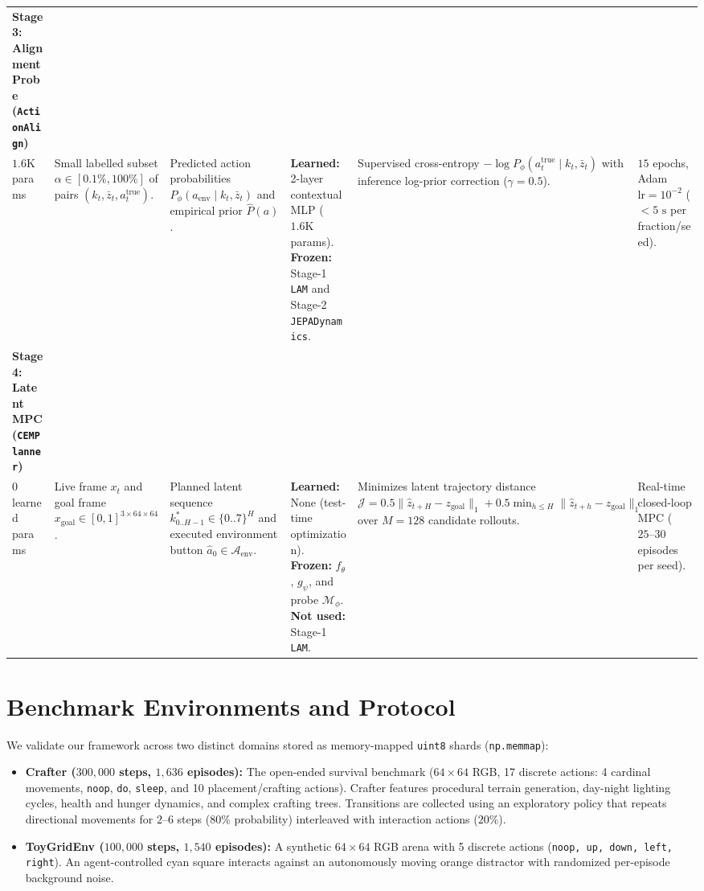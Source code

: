 \documentclass[11pt,letterpaper]{article}
\begin{document}
\begin{table}[t]
{\begin{tabular}{p{2.8cm}p{3.5cm}p{3.2cm}p{3.5cm}p{3.9cm}p{2.6cm}}
\midrule
\textbf{Stage 3: Alignment Probe (\texttt{ActionAlign})}\\ \footnotesize $1.6\text{K}$ params & Small labelled subset $\alpha \in [0.1\%, 100\%]$ of pairs $(k_t, \bar{z}_t, a_t^{\text{true}})$. & Predicted action probabilities $P_\phi(a_{\text{env}} \mid k_t, \bar{z}_t)$ and empirical prior $\hat{P}(a)$. & \textbf{Learned:} 2-layer contextual MLP ($1.6\text{K}$ params). \textbf{Frozen:} Stage-1 \texttt{LAM} and Stage-2 \texttt{JEPADynamics}. & Supervised cross-entropy $-\log P_\phi(a_t^{\text{true}} \mid k_t, \bar{z}_t)$ with inference log-prior correction ($\gamma = 0.5$). & $15$ epochs, Adam $\text{lr}=10^{-2}$ ($<5\text{ s}$ per fraction/seed). \\
\midrule
\textbf{Stage 4: Latent MPC (\texttt{CEMPlanner})}\\ \footnotesize $0$ learned params & Live frame $x_t$ and goal frame $x_{\text{goal}} \in [0,1]^{3 \times 64 \times 64}$. & Planned latent sequence $k_{0..H-1}^* \in \{0..7\}^H$ and executed environment button $\hat{a}_0 \in \mathcal{A}_{\text{env}}$. & \textbf{Learned:} None (test-time optimization). \textbf{Frozen:} $f_\theta$, $g_\psi$, and probe $\mathcal{M}_\phi$. \textbf{Not used:} Stage-1 \texttt{LAM}. & Minimizes latent trajectory distance $\mathcal{J} = 0.5\|\hat{z}_{t+H} - z_{\text{goal}}\|_1 + 0.5\min_{h \le H}\|\hat{z}_{t+h} - z_{\text{goal}}\|_1$ over $M=128$ candidate rollouts. & Real-time closed-loop MPC ($25\text{--}30$ episodes per seed). \\
\bottomrule
\end{tabular}%
}
\end{table}

\section{Benchmark Environments and Protocol}
We validate our framework across two distinct domains stored as memory-mapped \texttt{uint8} shards (\texttt{np.memmap}):
\begin{itemize}
  \item \textbf{Crafter ($300{,}000$ steps, $1{,}636$ episodes):} The open-ended survival benchmark \cite{hafner2021crafter} ($64 \times 64$ RGB, 17 discrete actions: 4 cardinal movements, \texttt{noop}, \texttt{do}, \texttt{sleep}, and 10 placement/crafting actions). Crafter features procedural terrain generation, day-night lighting cycles, health and hunger dynamics, and complex crafting trees. Transitions are collected using an exploratory policy that repeats directional movements for $2\text{--}6$ steps ($80\%$ probability) interleaved with interaction actions ($20\%$).
  \item \textbf{ToyGridEnv ($100{,}000$ steps, $1{,}540$ episodes):} A synthetic $64 \times 64$ RGB arena with 5 discrete actions (\texttt{noop, up, down, left, right}). An agent-controlled cyan square interacts against an autonomously moving orange distractor with randomized per-episode background noise.
\end{itemize}
\end{document}
